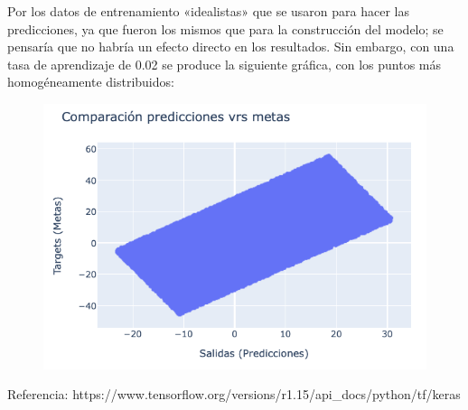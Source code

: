 \begin{sol}
	Por los datos de entrenamiento «idealistas» que se usaron para hacer las predicciones, ya que fueron los mismos que para la construcción del modelo; se pensaría que no habría un efecto directo en los resultados. Sin embargo, con una tasa de aprendizaje de 0.02 se produce la siguiente gráfica, con los puntos más homogéneamente distribuidos: 
	\begin{figure}[H]
		\centering 
		\includegraphics[scale=0.4]{Images/2}
	\end{figure}
	
\end{sol}

Referencia:
https://www.tensorflow.org/versions/r1.15/api\_docs/python/tf/keras



